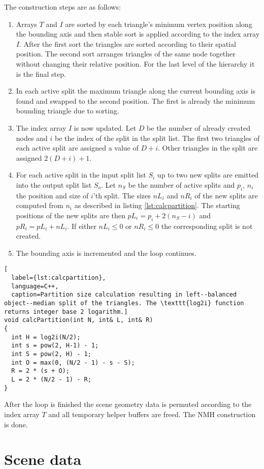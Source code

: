 The construction steps are as follows:
\begin{enumerate}
\item Arrays $T$ and $I$ are sorted by each triangle's minimum vertex position along the bounding axis and then stable sort is applied according to the index array $I$. After the first sort the triangles are sorted according to their spatial position. The second sort arranges triangles of the same node together without changing their relative position. For the last level of the hierarchy it is the final step.
\item In each active split the maximum triangle along the current bounding axis is found and swapped to the second position. The first is already the minimum bounding triangle due to sorting.
\item The index array $I$ is now updated. Let $D$ be the number of already created nodes and $i$ be the index of the split in the split list. The first two triangles of each active split are assigned a value of $D+i$. Other triangles in the split are assigned $2(D+i)+1$.
\item For each active split in the input split list $S_{i}$ up to two new splits are emitted into the output split list $S_{o}$. Let $n_{S}$ be the number of active splits and $p_{i}$, $n_{i}$ the position and size of $i$'th split. The sizes $nL_{i}$ and $nR_{i}$ of the new splits are computed from $n_{i}$ as described in listing \ref{lst:calcpartition}. The starting positions of the new splits are then $pL_{i} = p_{i} + 2(n_{S} - i)$ and $pR_{i} = pL_{i} + nL_{i}$. If either $nL_{i} \le 0$ or $nR_{i} \le 0$ the corresponding split is not created.
\item The bounding axis is incremented and the loop continues.
\end{enumerate}
\begin{lstlisting}[
  label={lst:calcpartition},
  language=C++,
  caption=Partition size calculation resulting in left--balanced object--median split of the triangles. The \texttt{log2i} function returns integer base 2 logarithm.]
void calcPartition(int N, int& L, int& R)
{
  int H = log2i(N/2);
  int s = pow(2, H-1) - 1;
  int S = pow(2, H) - 1;
  int O = max(0, (N/2 - 1) - s - S);
  R = 2 * (s + O);
  L = 2 * (N/2 - 1) - R;
}
\end{lstlisting}
After the loop is finished the scene geometry data is permuted according to the index array $T$ and all temporary helper buffers are freed. The NMH construction is done.

\section{Scene data}

